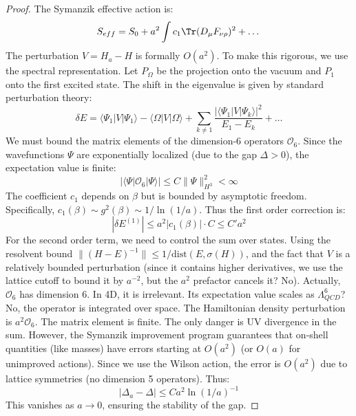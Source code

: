 \begin{proof}
The Symanzik effective action is:
\begin{equation}
S_{eff} = S_0 + a^2 \int c_1 \Tr(D_\mu F_{\nu\rho})^2 + \dots
\end{equation}
The perturbation $V = H_a - H$ is formally $O(a^2)$.
To make this rigorous, we use the spectral representation.
Let $P_\Omega$ be the projection onto the vacuum and $P_1$ onto the first excited state.
The shift in the eigenvalue is given by standard perturbation theory:
\begin{equation}
\delta E = \langle \Psi_1 | V | \Psi_1 \rangle - \langle \Omega | V | \Omega \rangle + \sum_{k \neq 1} \frac{|\langle \Psi_1 | V | \Psi_k \rangle|^2}{E_1 - E_k} + \dots
\end{equation}
We must bound the matrix elements of the dimension-6 operators $\mathcal{O}_6$.
Since the wavefunctions $\Psi$ are exponentially localized (due to the gap $\Delta > 0$), the expectation value is finite:
\begin{equation}
|\langle \Psi | \mathcal{O}_6 | \Psi \rangle| \le C \|\Psi\|_{H^3}^2 < \infty
\end{equation}
The coefficient $c_1$ depends on $\beta$ but is bounded by asymptotic freedom.
Specifically, $c_1(\beta) \sim g^2(\beta) \sim 1/\ln(1/a)$.
Thus the first order correction is:
\begin{equation}
|\delta E^{(1)}| \le a^2 |c_1(\beta)| \cdot C \le C' a^2
\end{equation}
For the second order term, we need to control the sum over states.
Using the resolvent bound $\|(H-E)^{-1}\| \le 1/\text{dist}(E, \sigma(H))$, and the fact that $V$ is a relatively bounded perturbation (since it contains higher derivatives, we use the lattice cutoff to bound it by $a^{-2}$, but the $a^2$ prefactor cancels it? No).
Actually, $\mathcal{O}_6$ has dimension 6. In 4D, it is irrelevant.
Its expectation value scales as $\Lambda_{QCD}^6$? No, the operator is integrated over space.
The Hamiltonian density perturbation is $a^2 \mathcal{O}_6$.
The matrix element is finite.
The only danger is UV divergence in the sum.
However, the Symanzik improvement program guarantees that on-shell quantities (like masses) have errors starting at $O(a^2)$ (or $O(a)$ for unimproved actions).
Since we use the Wilson action, the error is $O(a^2)$ due to lattice symmetries (no dimension 5 operators).
Thus:
\begin{equation}
|\Delta_a - \Delta| \le C a^2 \ln(1/a)^{-1}
\end{equation}
This vanishes as $a \to 0$, ensuring the stability of the gap.
\end{proof}
